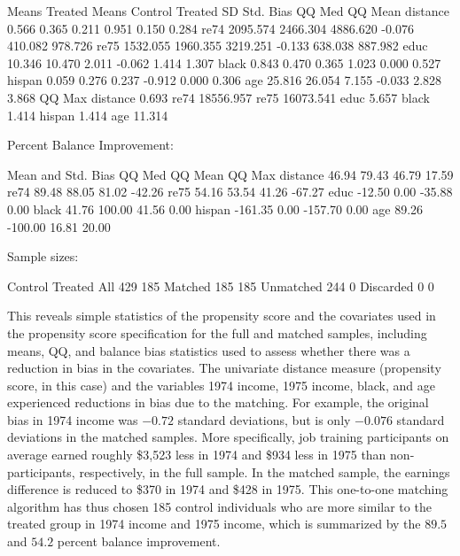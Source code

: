 \documentclass[oneside,letterpaper,titlepage]{article}
\begin{document}
\begin{enumerate}
\begin{Schunk}
\begin{Soutput}
         Means Treated Means Control Treated SD Std. Bias  QQ Med QQ Mean
distance         0.566         0.365      0.211     0.951   0.150   0.284
re74          2095.574      2466.304   4886.620    -0.076 410.082 978.726
re75          1532.055      1960.355   3219.251    -0.133 638.038 887.982
educ            10.346        10.470      2.011    -0.062   1.414   1.307
black            0.843         0.470      0.365     1.023   0.000   0.527
hispan           0.059         0.276      0.237    -0.912   0.000   0.306
age             25.816        26.054      7.155    -0.033   2.828   3.868
            QQ Max
distance     0.693
re74     18556.957
re75     16073.541
educ         5.657
black        1.414
hispan       1.414
age         11.314

Percent Balance Improvement:

         Mean and Std. Bias  QQ Med QQ Mean QQ Max
distance              46.94   79.43   46.79  17.59
re74                  89.48   88.05   81.02 -42.26
re75                  54.16   53.54   41.26 -67.27
educ                 -12.50    0.00  -35.88   0.00
black                 41.76  100.00   41.56   0.00
hispan              -161.35    0.00 -157.70   0.00
age                   89.26 -100.00   16.81  20.00

Sample sizes:

          Control Treated
All           429     185
Matched       185     185
Unmatched     244       0
Discarded       0       0
\end{Soutput}
\end{Schunk}

This reveals simple statistics of the propensity score and the
covariates used in the propensity score specification for the full and
matched samples, including means, QQ, and balance bias statistics used
to assess whether there was a reduction in bias in the covariates.
The univariate distance measure (propensity score, in this case) and the variables 1974 income, 1975 income, black, and age
experienced reductions in bias due to the matching.  For example, the
original bias in 1974 income was $-0.72$ standard deviations, but is
only $-0.076$ standard deviations in the matched samples.  More
specifically, job training participants on average earned roughly
\$3,523 less in 1974 and \$934 less in 1975 than non-participants,
respectively, in the full sample.  In the matched sample, the earnings
difference is reduced to \$370 in 1974 and \$428 in 1975.  This
one-to-one matching algorithm has thus chosen 185 control individuals
who are more similar to the treated group in 1974 income and 1975
income, which is summarized by the $89.5$ and $54.2$ percent
balance improvement. 


\end{enumerate}
\end{document}
